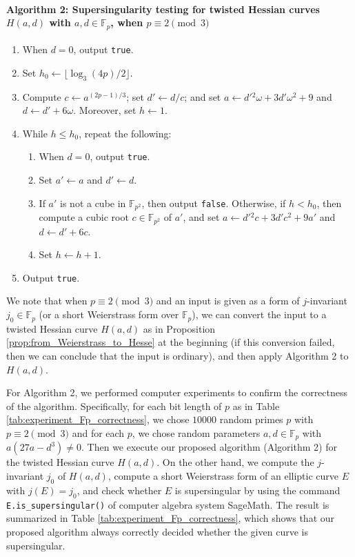 \documentclass{article}
\theoremstyle{definition}
\newcommand{\FF}{\mathbb{F}}
\begin{document}
\paragraph{Algorithm 2: Supersingularity testing for twisted Hessian curves $H(a,d)$ with $a,d \in \FF_p$, when $p \equiv 2 \pmod{3}$}

\begin{enumerate}
\item
When $d = 0$, output \texttt{true}.
\item
Set $h_0 \leftarrow \lfloor \log_3(4p) / 2 \rfloor$.
\item
Compute $c \leftarrow a^{(2p-1)/3}$; set $d' \leftarrow d/c$; and set $a \leftarrow d'{}^2 \omega + 3 d' \omega^2 + 9$ and $d \leftarrow d' + 6 \omega$.
Moreover, set $h \leftarrow 1$.
\item
While $h \leq h_0$, repeat the following:
\begin{enumerate}
\item
When $d = 0$, output \texttt{true}.
\item
Set $a' \leftarrow a$ and $d' \leftarrow d$.
\item
If $a'$ is not a cube in $\FF_{p^2}$, then output \texttt{false}.
Otherwise, if $h < h_0$, then compute a cubic root $c \in \FF_{p^2}$ of $a'$, and set $a \leftarrow d'{}^2 c + 3 d' c^2 + 9 a'$ and $d \leftarrow d' + 6 c$.
\item
Set $h \leftarrow h + 1$.
\end{enumerate}
\item
Output \texttt{true}.
\end{enumerate}
We note that when $p \equiv 2 \pmod{3}$ and an input is given as a form of $j$-invariant $j_0 \in \FF_p$ (or a short Weierstrass form over $\FF_p$), we can convert the input to a twisted Hessian curve $H(a,d)$ as in Proposition \ref{prop:from_Weierstrass_to_Hesse} at the beginning (if this conversion failed, then we can conclude that the input is ordinary), and then apply Algorithm 2 to $H(a,d)$.

For Algorithm 2, we performed computer experiments to confirm the correctness of the algorithm.
Specifically, for each bit length of $p$ as in Table \ref{tab:experiment_Fp_correctness}, we chose $10000$ random primes $p$ with $p \equiv 2 \pmod{3}$ and for each $p$, we chose random parameters $a,d \in \FF_p$ with $a (27a - d^3) \neq 0$.
Then we execute our proposed algorithm (Algorithm 2) for the twisted Hessian curve $H(a,d)$.
On the other hand, we compute the $j$-invariant $j_0$ of $H(a,d)$, compute a short Weierstrass form of an elliptic curve $E$ with $j(E) = j_0$, and check whether $E$ is supersingular by using the command \texttt{E.is\_supersingular()} of computer algebra system SageMath.
The result is summarized in Table \ref{tab:experiment_Fp_correctness}, which shows that our proposed algorithm always correctly decided whether the given curve is supersingular.
\end{document}
